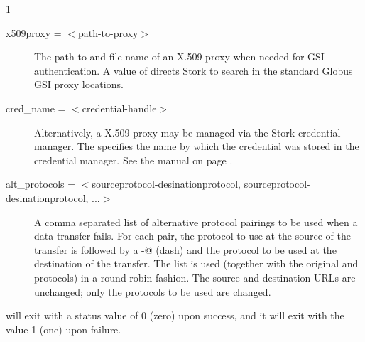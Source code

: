\begin{ManPage}{\label{man-stork-submit}}{1}
\begin{description}


\item[x509proxy = $<$path-to-proxy$>$]
The path to and file name of an X.509 proxy when needed
for GSI authentication.  A value of  directs Stork to
search in the standard Globus GSI proxy locations.

\item[cred\_name = $<$credential-handle$>$]
Alternatively, a X.509 proxy may be managed via the Stork credential manager.
The  specifies the name by which the credential was
stored in the credential manager.  See the 
 manual on page \pageref{man-stork-store-cred}.

\item[alt\_protocols = $<$sourceprotocol-desinationprotocol, sourceprotocol-desinationprotocol, ...$>$]
A comma separated list of alternative protocol pairings to be used
when a data transfer fails.
For each pair, the protocol to use at the source of the transfer
is followed by a \verb@-@ (dash) and the protocol to be used
at the destination of the transfer.
The list is used
(together with the original 
and  protocols)
in a round robin fashion.
The source and destination URLs are unchanged;
only the protocols to be used are changed.


\end{description}


\begin{Options}
  \ToolArgsBaseDesc
  \StorknameDesc
\end{Options}

\ExitStatus

 will exit with a status value of 0 (zero) upon success,
and it will exit with the value 1 (one) upon failure.

\end{ManPage}
